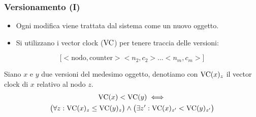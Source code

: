\begin{frame}
  \frametitle{Versionamento (I)}
  \begin{itemize}
  \item Ogni modifica viene trattata dal sistema come un nuovo oggetto.
  \item Si utilizzano i \alert{vector clock} ($\mathrm{VC}$) per tenere traccia delle versioni:
  \end{itemize}
  \centering
    \[
    \big[<\mathrm{nodo}, \mathrm{counter}> <n_2, c_2> ... <n_m, c_m> \big]
    \]
    
  \begin{definizione}
    Siano $x$ e $y$ due versioni del medesimo oggetto, denotiamo con $\mathrm{VC}(x)_z$ il vector clock di $x$ relativo al nodo $z$.
    \begin{multline*}
    \mathrm{VC}(x) < \mathrm{VC}(y) \iff \\
      \big( \forall z \mathrel{:} \mathrm{VC}(x)_z \leq \mathrm{VC}(y)_z \big) \land \big( \exists z' \mathrel{:} \mathrm{VC}(x)_{z'} < \mathrm{VC}(y)_{z'} \big) 
    \end{multline*}
  \end{definizione}
\end{frame}


